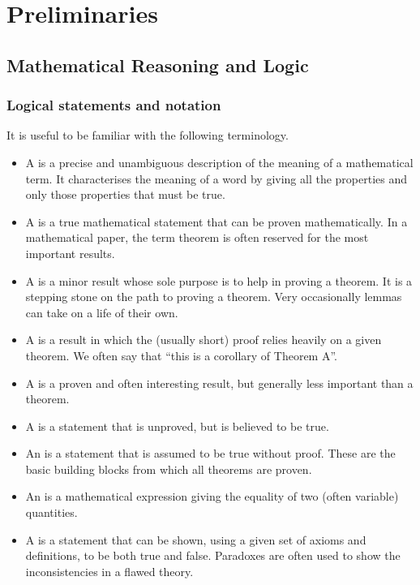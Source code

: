 \setcounter{page}{1}
\part{Preliminaries}
\chapter{Mathematical Reasoning and Logic}

\section{Logical statements and notation}
It is useful to be familiar with the following terminology.
\begin{itemize}
\item A  is a precise and unambiguous description of the meaning of a mathematical term. It characterises the meaning of a word by giving all the properties and only those properties that must be true.
\item A  is a true mathematical statement that can be proven mathematically. In a mathematical paper, the term theorem is often reserved for the most important results.
\item A  is a minor result whose sole purpose is to help in proving a theorem. It is a stepping stone on the path to proving a theorem. Very occasionally lemmas can take on a life of their own.
\item A  is a result in which the (usually short) proof relies heavily on a given theorem. We often say that ``this is a corollary of Theorem A''.
\item A  is a proven and often interesting result, but generally less important than a theorem.
\item A  is a statement that is unproved, but is believed to be true.
\item An  is a statement that is assumed to be true without proof. These are the basic building blocks from which all theorems are proven.
\item An  is a mathematical expression giving the equality of two (often variable) quantities.
\item A  is a statement that can be shown, using a given set of axioms and definitions, to be both true and false. Paradoxes are often used to show the inconsistencies in a flawed theory.
\end{itemize}

